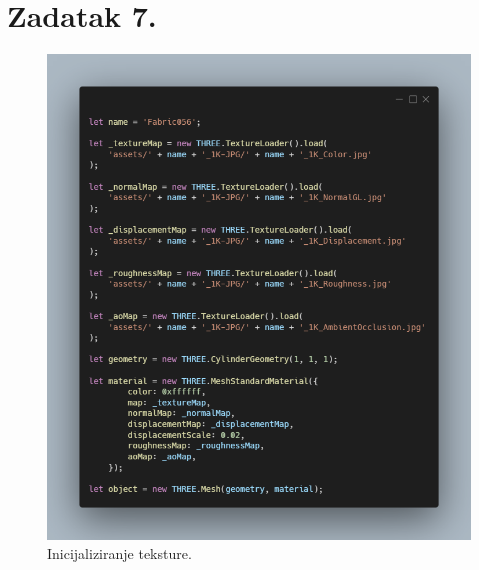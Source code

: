 \documentclass[a4paper,12pt]{article}
\begin{document}
\section{Zadatak 7.}
\begin{figure}[ht]
    \centering
    \includegraphics[scale=0.5]{image/zadatak7.png}
    \caption{Inicijaliziranje teksture.}
\end{figure}
\end{document}
